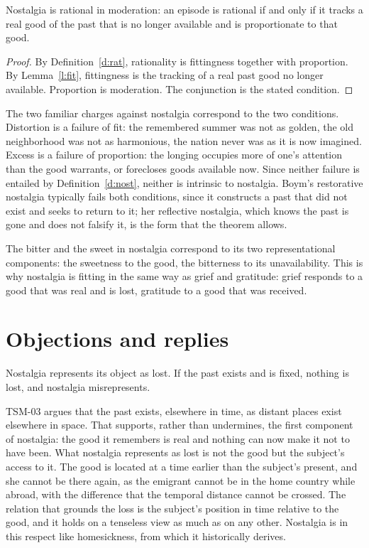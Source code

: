 \documentclass{situationist-preprint}
\begin{document}
\begin{theorem}\label{t:main}
Nostalgia is rational in moderation: an episode is rational if and only if it tracks a real good of the past that is no longer available and is proportionate to that good.
\end{theorem}

\begin{proof}
By Definition~\ref{d:rat}, rationality is fittingness together with proportion. By Lemma~\ref{l:fit}, fittingness is the tracking of a real past good no longer available. Proportion is moderation. The conjunction is the stated condition.
\end{proof}

The two familiar charges against nostalgia correspond to the two conditions. Distortion is a failure of fit: the remembered summer was not as golden, the old neighborhood was not as harmonious, the nation never was as it is now imagined. Excess is a failure of proportion: the longing occupies more of one's attention than the good warrants, or forecloses goods available now. Since neither failure is entailed by Definition~\ref{d:nost}, neither is intrinsic to nostalgia. Boym's restorative nostalgia typically fails both conditions, since it constructs a past that did not exist and seeks to return to it; her reflective nostalgia, which knows the past is gone and does not falsify it, is the form that the theorem allows.

The bitter and the sweet in nostalgia correspond to its two representational components: the sweetness to the good, the bitterness to its unavailability. This is why nostalgia is fitting in the same way as grief and gratitude: grief responds to a good that was real and is lost, gratitude to a good that was received.

\section{Objections and replies}

\begin{objection}\label{o:gone}
Nostalgia represents its object as lost. If the past exists and is fixed, nothing is lost, and nostalgia misrepresents.
\end{objection}

\begin{reply}
TSM-03 argues that the past exists, elsewhere in time, as distant places exist elsewhere in space. That supports, rather than undermines, the first component of nostalgia: the good it remembers is real and nothing can now make it not to have been. What nostalgia represents as lost is not the good but the subject's access to it. The good is located at a time earlier than the subject's present, and she cannot be there again, as the emigrant cannot be in the home country while abroad, with the difference that the temporal distance cannot be crossed. The relation that grounds the loss is the subject's position in time relative to the good, and it holds on a tenseless view as much as on any other. Nostalgia is in this respect like homesickness, from which it historically derives.
\end{reply}
\end{document}
